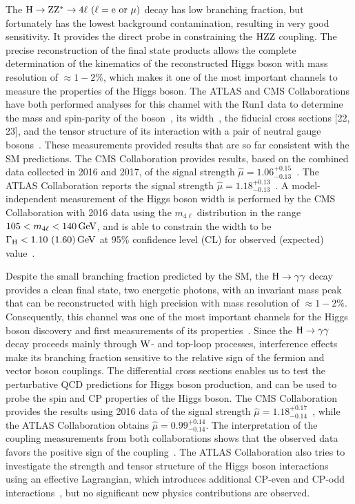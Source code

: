 The $\PH\to\cPZ\cPZ^{*}\to 4\ell\ (\ell=\re\ \text{or}\ \mu)$ decay has low branching fraction, but fortunately has the lowest background contamination, resulting in very good sensitivity. It provides the direct probe in constraining the $\mathrm{H}\mathrm{Z}\mathrm{Z}$ coupling. The precise reconstruction of the final state products allows the complete determination of the kinematics of the reconstructed Higgs boson with mass resolution of $\approx 1 - 2\%$, which makes it one of the most important channels to measure the properties of the Higgs boson. The ATLAS and CMS Collaborations have both performed analyses for this channel with the Run1 data to determine the mass and spin-parity of the boson~\cite{Chatrchyan:2013mxa,Chatrchyan:2012jja,Khachatryan:2014kca,Aad:2014eva,Aad:2015mxa}, its width~\cite{Khachatryan:2014iha,Khachatryan:2015mma,Aad:2015xua}, the fiducial cross sections [22, 23], and the tensor structure of its interaction with a pair of neutral gauge bosons~\cite{Khachatryan:2014kca,Aad:2015mxa,Khachatryan:2015mma}. These measurements provided results that are so far consistent with the SM predictions. The CMS Collaboration provides results, based on the combined data collected in 2016 and 2017, of the signal strength $\hat{\mu}=1.06^{+0.15}_{-0.13}$~\cite{CMS-PAS-HIG-18-001}. The ATLAS Collaboration reports the signal strength $\hat{\mu}=1.18^{+0.13}_{-0.13}$~\cite{ATLAS-CONF-2018-018}. A model-independent measurement of the Higgs boson width is performed by the CMS Collaboration with 2016 data using the $m_{4\ell}$ distribution in the range $105 < m_{4\ell} < 140\,\text{Ge\hspace{-.08em}V}$, and is able to constrain the width to be $\Gamma_{\mathrm{H}}<1.10\ (1.60)\,\text{Ge\hspace{-.08em}V}$ at 95\% confidence level (CL) for observed (expected) value~\cite{Sirunyan:2017exp}.

Despite the small branching fraction predicted by the SM, the $\mathrm{H}\to\gamma\gamma$ decay provides a clean final state, two energetic photons, with an invariant mass peak that can be reconstructed with high precision with mass resolution of $\approx 1 - 2\%$. Consequently, this channel was one of the most important channels for the Higgs boson discovery and first measurements of its properties~\cite{Khachatryan:2014ira,Aad:2014eha}. Since the $\mathrm{H}\to\gamma\gamma$ decay proceeds mainly through $\mathrm{W}$- and top-loop processes, interference effects make its branching fraction sensitive to the relative sign of the fermion and vector boson couplings. The differential cross sections enables us to test the perturbative QCD predictions for Higgs boson production, and can be used to probe the spin and CP properties of the Higgs boson. The CMS Collaboration provides the results using 2016 data of the signal strength $\hat{\mu}=1.18^{+0.17}_{-0.14}$~\cite{Sirunyan:2018ouh}, while the ATLAS Collaboration obtains $\hat{\mu}=0.99^{+0.14}_{-0.14}$. The interpretation of the coupling measurements from both collaborations shows that the observed data favors the positive sign of the coupling~\cite{Sirunyan:2018kta,Aaboud:2018xdt}. The ATLAS Collaboration also tries to investigate the strength and tensor structure of the Higgs boson interactions using an effective Lagrangian, which introduces additional CP-even and CP-odd interactions~\cite{Aaboud:2018xdt}, but no significant new physics contributions are observed.

